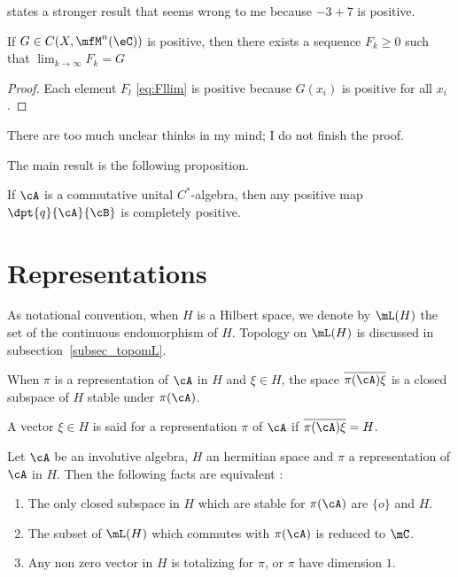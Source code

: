 \begin{probleme}
  \cite{Landsman} states a stronger result that seems wrong to me because \( -3+7\) is positive.
\end{probleme}

\begin{proposition}
If $G\in C(X,\mfM^n(\eC))$ is positive, then there exists a sequence $F_k\geq 0$ such that $\lim_{k\to\infty}F_k=G$
\end{proposition}

\begin{proof}
Each element $F_l$ \eqref{eq:Fllim} is positive because  $G(x_i)$ is positive for all $x_i$.
\end{proof}

\begin{probleme}
    There are too much unclear thinks in my mind; I do not finish the proof.
\end{probleme}

The main result is the following proposition.

\begin{proposition}
If $\cA$ is a commutative unital $C^*$-algebra, then any positive map $\dpt{ q }{ \cA }{ \cB }$ is completely positive.
\end{proposition}


\section{Representations}

As notational convention, when $H$ is a Hilbert space, we denote by $\mL(H)$ the set of the continuous endomorphism of $H$. Topology on $\mL(H)$ is discussed in subsection~\ref{subsec_topomL}.

When $\pi$ is a representation of $\cA$ in $H$ and $\xi\in H$, the space $\overline{ \pi(\cA)\xi }$ is a closed subspace of $H$ stable under $\pi(\cA)$.

\begin{definition}
A vector $\xi\in H$ is said  for a
representation $\pi$ of $\cA$ if $\overline{ \pi(\cA)\xi }=H$.
\end{definition}

\begin{proposition}
Let $\cA$ be an involutive algebra, $H$ an hermitian space and $\pi$ a representation of $\cA$ in $H$. Then the following facts are equivalent
:
\begin{enumerate}
\item The only closed subspace in $H$ which are stable for $\pi(\cA)$
are $\{o\}$ and $H$.
\item The subset of $\mL(H)$ which commutes with $\pi(\cA)$ is reduced
to $\mC$.
\item Any non zero vector in $H$ is totalizing for $\pi$, or $\pi$ have
dimension $1$.
\end{enumerate}
 \label{prop:reprez_topo}
\end{proposition}

